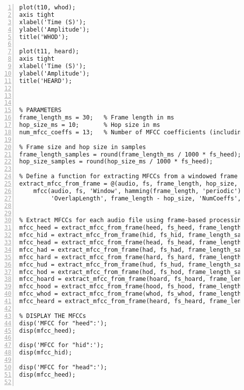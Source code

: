 \documentclass{article}
\begin{document}
\begin{lstlisting}[frame=single, numbers=left, style=Matlab-editor, caption={shared\_feature\_extraction.mlx}, label={lst:shared_feature_extraction}]
plot(t10, whod);  
axis tight
xlabel('Time (S)');
ylabel('Amplitude');
title('WHOD');

plot(t11, heard);  
axis tight
xlabel('Time (S)');
ylabel('Amplitude');
title('HEARD');



% PARAMETERS
frame_length_ms = 30;   % Frame length in ms
hop_size_ms = 10;       % Hop size in ms
num_mfcc_coeffs = 13;   % Number of MFCC coefficients (including zeroth)

% Frame size and hop size in samples
frame_length_samples = round(frame_length_ms / 1000 * fs_heed);  % Convert ms to samples
hop_size_samples = round(hop_size_ms / 1000 * fs_heed);        % Convert ms to samples

% Define a function for extracting MFCCs from a windowed frame
extract_mfcc_from_frame = @(audio, fs, frame_length, hop_size, num_coeffs) ...
    mfcc(audio, fs, 'Window', hamming(frame_length, 'periodic'), ...
         'OverlapLength', frame_length - hop_size, 'NumCoeffs', num_coeffs);


% Extract MFCCs for each audio file using frame-based processing
mfcc_heed = extract_mfcc_from_frame(heed, fs_heed, frame_length_samples, hop_size_samples, num_mfcc_coeffs);
mfcc_hid = extract_mfcc_from_frame(hid, fs_hid, frame_length_samples, hop_size_samples, num_mfcc_coeffs);
mfcc_head = extract_mfcc_from_frame(head, fs_head, frame_length_samples, hop_size_samples, num_mfcc_coeffs);
mfcc_had = extract_mfcc_from_frame(had, fs_had, frame_length_samples, hop_size_samples, num_mfcc_coeffs);
mfcc_hard = extract_mfcc_from_frame(hard, fs_hard, frame_length_samples, hop_size_samples, num_mfcc_coeffs);
mfcc_hud = extract_mfcc_from_frame(hud, fs_hud, frame_length_samples, hop_size_samples, num_mfcc_coeffs);
mfcc_hod = extract_mfcc_from_frame(hod, fs_hod, frame_length_samples, hop_size_samples, num_mfcc_coeffs);
mfcc_hoard = extract_mfcc_from_frame(hoard, fs_hoard, frame_length_samples, hop_size_samples, num_mfcc_coeffs);
mfcc_hood = extract_mfcc_from_frame(hood, fs_hood, frame_length_samples, hop_size_samples, num_mfcc_coeffs);
mfcc_whod = extract_mfcc_from_frame(whod, fs_whod, frame_length_samples, hop_size_samples, num_mfcc_coeffs);
mfcc_heard = extract_mfcc_from_frame(heard, fs_heard, frame_length_samples, hop_size_samples, num_mfcc_coeffs);

% DISPLAY THE MFCCs
disp('MFCC for "heed":');
disp(mfcc_heed);

disp('MFCC for "hid":');
disp(mfcc_hid);

disp('MFCC for "head":');
disp(mfcc_heed);


\end{lstlisting}
\end{document}
